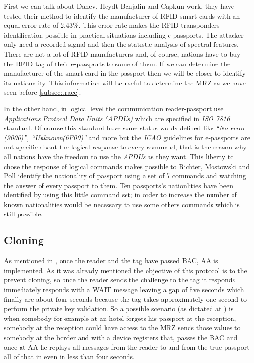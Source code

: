 \documentclass{acm_proc_article-sp}
\begin{document}
First we can talk about Danev, Heydt-Benjalin and Capkun \cite{05DABO2009} work, they have tested their method 
to identify the manufacturer of RFID smart cards with an equal error rate of 2.43\%. This error rate 
makes the RFID transponders identification possible in practical situations including e-passports. 
The attacker only need a recorded signal and then the statistic analysis of spectral features. 
There are not a lot of RFID manufacturers and, of course, nations have to buy the RFID tag of their 
e-passports to some of them. If we can determine the manufacturer of the smart card in the passport 
then we will be closer to identify its nationality. This information will be useful to determine the 
MRZ as we have seen before \ref{subsec:trace}.

In the other hand, in logical level the communication reader-passport use \textit{Applications Protocol 
Data Units (APDUs)} which are specified in \textit{ISO 7816} standard. Of course this standard have some status 
words defined like \textit{“No error (9000)”, “Unknown(6F00)”} and more but the \textit{ICAO} guidelines for 
e-passports are not specific about the logical response to every command, that is the reason why 
all nations have the freedom to use the \textit{APDUs} as they want. This liberty to chose the response of 
logical commands makes possible to Richter, Mostowski and Poll \cite{03HENN} identify the nationality of 
passport using a set of 7 commands and watching the answer of every passport to them. Ten passports's 
nationlities have been identified by using this little command set; in order to increase the number of 
known nationalities would be necessary to use some others commands which is still possible.


\subsection{Cloning}
As mentioned in \cite{MHTR07}, once the reader and the tag have passed BAC, AA is implemented. 
As it was already mentioned the objective of this protocol is to the prevent cloning, 
so once the reader sends the challenge to the tag it responds immediately responds with a 
WAIT message leaving a gap of five seconds which finally are about four seconds because the 
tag takes approximately one second to perform the private key validation. 
So a possible scenario (as dictated at \cite{MHTR07}) is when somebody for 
example at an hotel forgets his passport at the reception, somebody at the reception 
could have access to the MRZ sends those values to somebody at the border and with a 
device registers that, passes the BAC and once at AA he replays all messages from the 
reader to and from the true passport all of that in even in less than four seconds.
\end{document}

